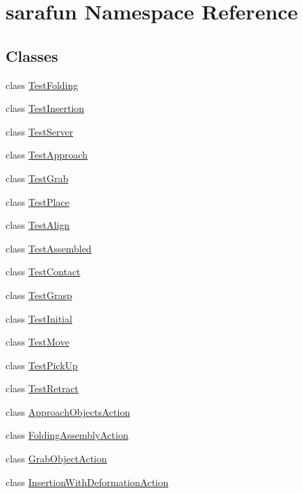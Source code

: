 \hypertarget{namespacesarafun}{\section{sarafun Namespace Reference}
\label{namespacesarafun}
}
\subsection*{Classes}
\begin{DoxyCompactItemize}
\item 
class \hyperlink{classsarafun_1_1TestFolding}{Test\-Folding}
\item 
class \hyperlink{classsarafun_1_1TestInsertion}{Test\-Insertion}
\item 
class \hyperlink{classsarafun_1_1TestServer}{Test\-Server}
\item 
class \hyperlink{classsarafun_1_1TestApproach}{Test\-Approach}
\item 
class \hyperlink{classsarafun_1_1TestGrab}{Test\-Grab}
\item 
class \hyperlink{classsarafun_1_1TestPlace}{Test\-Place}
\item 
class \hyperlink{classsarafun_1_1TestAlign}{Test\-Align}
\item 
class \hyperlink{classsarafun_1_1TestAssembled}{Test\-Assembled}
\item 
class \hyperlink{classsarafun_1_1TestContact}{Test\-Contact}
\item 
class \hyperlink{classsarafun_1_1TestGrasp}{Test\-Grasp}
\item 
class \hyperlink{classsarafun_1_1TestInitial}{Test\-Initial}
\item 
class \hyperlink{classsarafun_1_1TestMove}{Test\-Move}
\item 
class \hyperlink{classsarafun_1_1TestPickUp}{Test\-Pick\-Up}
\item 
class \hyperlink{classsarafun_1_1TestRetract}{Test\-Retract}
\item 
class \hyperlink{classsarafun_1_1ApproachObjectsAction}{Approach\-Objects\-Action}
\item 
class \hyperlink{classsarafun_1_1FoldingAssemblyAction}{Folding\-Assembly\-Action}
\item 
class \hyperlink{classsarafun_1_1GrabObjectAction}{Grab\-Object\-Action}
\item 
class \hyperlink{classsarafun_1_1InsertionWithDeformationAction}{Insertion\-With\-Deformation\-Action}
\item 

\end{DoxyCompactItemize}
